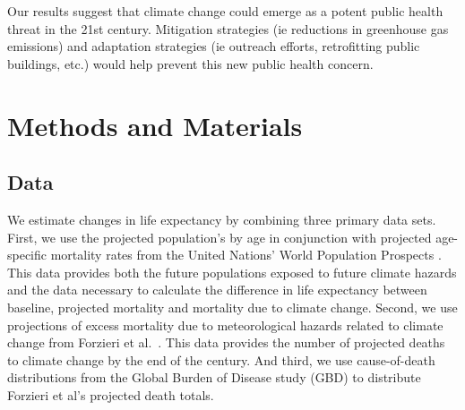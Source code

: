 \documentclass[12pt]{article}
\begin{document}
Our results suggest that climate change could emerge as a potent public
health threat in the 21st century. Mitigation strategies (ie reductions
in greenhouse gas emissions) and adaptation strategies (ie outreach
efforts, retrofitting public buildings, etc.) would help prevent this
new public health concern.

\hypertarget{methods-and-materials}{%
\section{Methods and Materials}\label{methods-and-materials}}

\hypertarget{data}{%
\subsection{Data}\label{data}}

We estimate changes in life expectancy by combining three primary data
sets. First, we use the projected population's by age in conjunction
with projected age-specific mortality rates from the United Nations'
World Population Prospects \citep{united2017world}. This data provides
both the future populations exposed to future climate hazards and the
data necessary to calculate the difference in life expectancy between
baseline, projected mortality and mortality due to climate change.
Second, we use projections of excess mortality due to meteorological
hazards related to climate change from Forzieri et
al.~\citeyearpar{forzieri2017increasing}. This data provides the number
of projected deaths to climate change by the end of the century. And
third, we use cause-of-death distributions from the Global Burden of
Disease study (GBD) \citep{GBD, wang2012age} to distribute Forzieri et
al's \citeyearpar{forzieri2017increasing} projected death totals.
\end{document}
